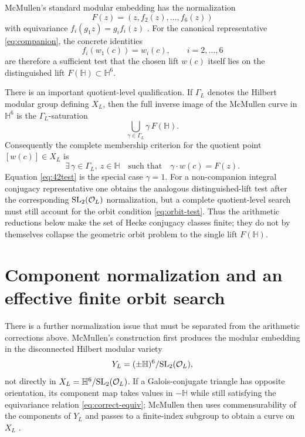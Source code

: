 McMullen's standard modular embedding has the normalization
\begin{equation}\label{eq:mcmullenF}
 F(z)=(z,f_2(z),\ldots,f_6(z))
\end{equation}
with equivariance $f_i(g_1z)=g_i f_i(z)$ \cite[Sec.~6]{McMullen2026}. For the canonical representative \eqref{eq:companion}, the concrete identities
\begin{equation}\label{eq:42test}
 f_i(w_1(c))=w_i(c),\qquad i=2,\ldots,6
\end{equation}
are therefore a sufficient test that the chosen lift $w(c)$ itself lies on the distinguished lift $F(\mathbb H)\subset\mathbb H^6$.

There is an important quotient-level qualification. If $\Gamma_L$ denotes the Hilbert modular group defining $X_L$, then the full inverse image of the McMullen curve in $\mathbb H^6$ is the $\Gamma_L$-saturation
\[
 \bigcup_{\gamma\in\Gamma_L}\gamma\,F(\mathbb H).
\]
Consequently the complete membership criterion for the quotient point $[w(c)]\in X_L$ is
\begin{equation}\label{eq:orbit-test}
 \exists\,\gamma\in\Gamma_L,\ z\in\mathbb H
 \quad\text{such that}\quad
 \gamma\cdot w(c)=F(z).
\end{equation}
Equation \eqref{eq:42test} is the special case $\gamma=1$. For a non-companion integral conjugacy representative one obtains the analogous distinguished-lift test after the corresponding $\mathrm{SL}_2(\mathcal O_L)$ normalization, but a complete quotient-level search must still account for the orbit condition \eqref{eq:orbit-test}. Thus the arithmetic reductions below make the set of Hecke conjugacy classes finite; they do not by themselves collapse the geometric orbit problem to the single lift $F(\mathbb H)$.


\section{Component normalization and an effective finite orbit search}\label{app:components}
There is a further normalization issue that must be separated from the arithmetic
corrections above.  McMullen's construction first produces the modular embedding in the
disconnected Hilbert modular variety
\[
 Y_L=(\pm\mathbb H)^6/\mathrm{SL}_2(\mathcal O_L),
\]
not directly in $X_L=\mathbb H^6/\mathrm{SL}_2(\mathcal O_L)$.  If a Galois-conjugate triangle
has opposite orientation, its component map takes values in $-\mathbb H$ while still
satisfying the equivariance relation \eqref{eq:correct-equiv}; McMullen then uses
commensurability of the components of $Y_L$ and passes to a finite-index subgroup to
obtain a curve on $X_L$ \cite[Prop.~6.1, Cor.~6.2 and proof of Thm.~1.9]{McMullen2026}.

